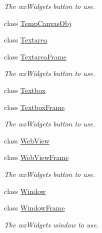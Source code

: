 \begin{DoxyCompactItemize}
\begin{DoxyCompactList}\small\item\em The wx\+Widgets button to use. \end{DoxyCompactList}\item 
class \mbox{\hyperlink{class_rad_j_a_v_1_1_g_u_i_1_1_temp_canvas_obj}{Temp\+Canvas\+Obj}}
\item 
class \mbox{\hyperlink{class_rad_j_a_v_1_1_g_u_i_1_1_textarea}{Textarea}}
\item 
class \mbox{\hyperlink{class_rad_j_a_v_1_1_g_u_i_1_1_textarea_frame}{Textarea\+Frame}}
\begin{DoxyCompactList}\small\item\em The wx\+Widgets button to use. \end{DoxyCompactList}\item 
class \mbox{\hyperlink{class_rad_j_a_v_1_1_g_u_i_1_1_textbox}{Textbox}}
\item 
class \mbox{\hyperlink{class_rad_j_a_v_1_1_g_u_i_1_1_textbox_frame}{Textbox\+Frame}}
\begin{DoxyCompactList}\small\item\em The wx\+Widgets button to use. \end{DoxyCompactList}\item 
class \mbox{\hyperlink{class_rad_j_a_v_1_1_g_u_i_1_1_web_view}{Web\+View}}
\item 
class \mbox{\hyperlink{class_rad_j_a_v_1_1_g_u_i_1_1_web_view_frame}{Web\+View\+Frame}}
\begin{DoxyCompactList}\small\item\em The wx\+Widgets button to use. \end{DoxyCompactList}\item 
class \mbox{\hyperlink{class_rad_j_a_v_1_1_g_u_i_1_1_window}{Window}}
\item 
class \mbox{\hyperlink{class_rad_j_a_v_1_1_g_u_i_1_1_window_frame}{Window\+Frame}}
\begin{DoxyCompactList}\small\item\em The wx\+Widgets window to use. \end{DoxyCompactList}\end{DoxyCompactItemize}
